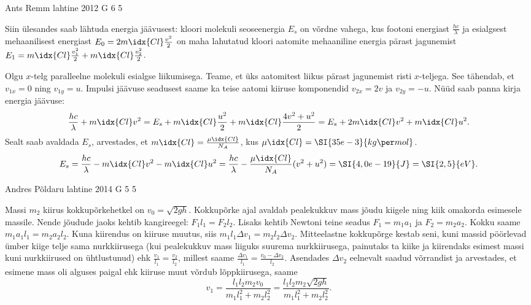 \documentclass[11pt, twoside]{article}
\begin{document}
{%
{Ants Remm} %
{lahtine} %
{2012} %
{G 6} %
{5} %
{

\ifSolution
Siin ülesandes saab lähtuda energia jäävusest: kloori molekuli seoseenergia $E_s$ on võrdne vahega, kus footoni energiast $\frac{hc}{\lambda}$ ja esialgsest mehaanilisest energiast $E_0 = 2m\idx{Cl} \frac{v^2}{2} $ on maha lahutatud kloori aatomite mehaaniline energia pärast jagunemist $E_1 = m\idx{Cl} \frac{v_1^2}{2} + m\idx{Cl} \frac{v_2^2}{2}$.

Olgu $x$-telg paralleelne molekuli esialgse liikumisega. Teame, et üks aatomitest liikus pärast jagunemist risti $x$-teljega. See tähendab, et $v_{1x} = 0$ ning $v_{1y} = u$. Impulsi jäävuse seadusest saame ka teise aatomi kiiruse komponendid $v_{2x} = 2 v$ ja $v_{2y} = -u$.  Nüüd saab panna kirja energia jäävuse:
$$
	\frac{hc}{\lambda} + m\idx{Cl} v^2  = E_s + m\idx{Cl} \frac{u^2}{2} + m\idx{Cl} \frac{4v^2 + u^2}{2} = E_s + 2 m\idx{Cl} v^2 + m\idx{Cl} u^2.
$$
Sealt saab avaldada $E_s$, arvestades, et $m\idx{Cl} = \frac{\mu\idx{Cl}}{N_A}$, kus $\mu\idx{Cl} = \SI{35e-3}{kg\per mol}$.
$$ E_s = \frac{hc}{\lambda} - m\idx{Cl} v^2 - m\idx{Cl} u^2 = \frac{hc}{\lambda} - \frac{\mu\idx{Cl}}{N_A} (v^2 + u^2) = \SI{4,0e-19}{J} = \SI{2,5}{eV}.
$$
\fi
}

{Andres Põldaru} %
{lahtine} %
{2014} %
{G 5} %
{5} %
{

\ifSolution
Massi $m_2$ kiirus kokkupõrkehetkel on $v_0=\sqrt{2gh}$. Kokkupõrke ajal avaldab pealekukkuv mass jõudu kiigele ning kiik omakorda esimesele massile. Nende jõudude jaoks kehtib kangireegel: $F_1l_1=F_2l_2$. Lisaks kehtib Newtoni teine seadus $F_1=m_1a_1$ ja $F_2=m_2a_2$. Kokku saame $m_1a_1l_1=m_2a_2l_2$. Kuna kiirendus on kiiruse muutus, siis  $m_1l_1\Delta v_1=m_2l_2\Delta v_2$. Mitteelastne kokkupõrge kestab seni, kuni massid pöörlevad ümber kiige telje sama nurkkiirusega (kui pealekukkuv mass liiguks suurema nurkkiirusega, painutaks ta kiike ja kiirendaks esimest massi kuni nurkkiirused on ühtlustunud) ehk $\frac{v_1}{l_1}=\frac{v_2}{l_2}$, millest saame $\frac{\Delta v_1}{l_1}=\frac{v_0-\Delta v_2}{l_2}$. Asendades $\Delta v_2$ eelnevalt saadud võrrandist ja arvestades, et esimene mass oli alguses paigal ehk kiiruse muut võrdub lõppkiirusega, saame 
\[
v_1=\frac{l_1l_2m_2v_0}{m_1l_1^2+m_2l_2^2}=\frac{l_1l_2m_2\sqrt{2gh}}{m_1l_1^2+m_2l_2^2}.
\]

}}
\end{document}
